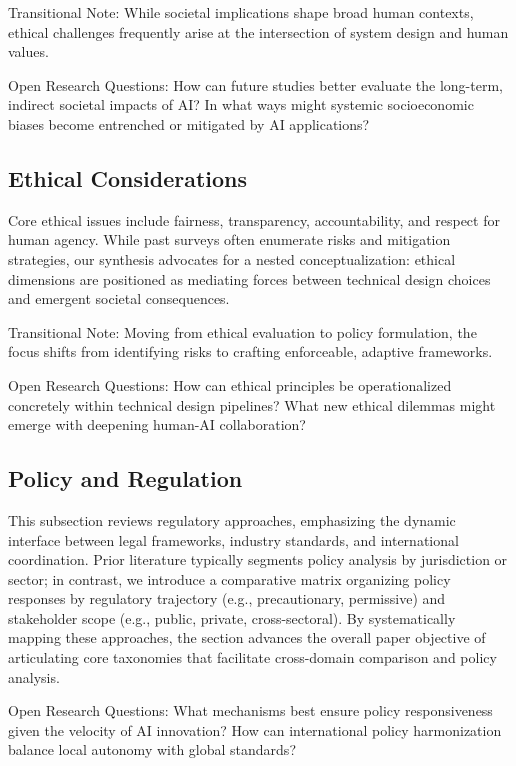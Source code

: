 \documentclass[sigconf]{acmart}
\begin{document}
Transitional Note: While societal implications shape broad human contexts, ethical challenges frequently arise at the intersection of system design and human values.

Open Research Questions: How can future studies better evaluate the long-term, indirect societal impacts of AI? In what ways might systemic socioeconomic biases become entrenched or mitigated by AI applications?

\subsection{Ethical Considerations}
Core ethical issues include fairness, transparency, accountability, and respect for human agency. While past surveys often enumerate risks and mitigation strategies, our synthesis advocates for a nested conceptualization: ethical dimensions are positioned as mediating forces between technical design choices and emergent societal consequences.

Transitional Note: Moving from ethical evaluation to policy formulation, the focus shifts from identifying risks to crafting enforceable, adaptive frameworks.

Open Research Questions: How can ethical principles be operationalized concretely within technical design pipelines? What new ethical dilemmas might emerge with deepening human-AI collaboration?

\subsection{Policy and Regulation}
This subsection reviews regulatory approaches, emphasizing the dynamic interface between legal frameworks, industry standards, and international coordination. Prior literature typically segments policy analysis by jurisdiction or sector; in contrast, we introduce a comparative matrix organizing policy responses by regulatory trajectory (e.g., precautionary, permissive) and stakeholder scope (e.g., public, private, cross-sectoral). By systematically mapping these approaches, the section advances the overall paper objective of articulating core taxonomies that facilitate cross-domain comparison and policy analysis.

Open Research Questions: What mechanisms best ensure policy responsiveness given the velocity of AI innovation? How can international policy harmonization balance local autonomy with global standards?
\end{document}
